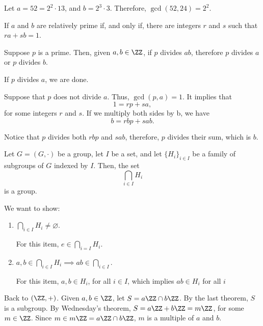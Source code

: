 \begin{exmp}
	Let $a = 52 = 2^2 \cdot 13$, and $b = 2^3 \cdot 3$. Therefore,  $\gcd(52, 24) = 2^2$.
\end{exmp}

\begin{cor}
	If $a$ and $b$ are relatively prime if, and only if, there are integers $r$ and $s$ such that $ra + sb = 1$.
\end{cor}

\begin{cor}
	Suppose $p$ is a prime. Then, given $a, b \in \ZZ$, if $p$ divides $ab$, therefore $p$ divides $a$ or $p$ divides $b$.  
\end{cor}

\begin{dem}
	If $p$ divides $a$, we are done.

	Suppose that $p$ does not divide $a$. Thus, $\gcd(p, a) = 1$. It implies that \[1 = rp + sa,\] for some integers $r$ and $s$. If we multiply both sides by b, we have \[b = rbp + sab.\]

	Notice that $p$ divides both $rbp$ and $sab$, therefore, $p$ divides their sum, which is $b$.
\end{dem}

\begin{thm}
	Let $G = (G, \cdot)$ be a group, let $I$ be a set, and let $\{H_i\}_{i \in I}$ be a family of subgroups of $G$ indexed by $I$. Then, the set \[\bigcap_{i \in I} H_i\] is a group.
\end{thm}

\begin{dem}
	We want to show:
	\begin{enumerate}[label = (\roman*)]
		\item $\bigcap_{i \in I}H_i \neq \varnothing$.

			For this item, $e \in \bigcap_{i = I}H_i$.

		\item $a, b \in \bigcap_{i \in I} H_i \implies ab \in \bigcap_{i \in I}$.

			For this item, $a, b \in H_i$, for all $i \in I$, which implies $ab \in H_i$ for all $i$
	\end{enumerate}
\end{dem}

Back to $(\ZZ, +)$. Given  $a, b \in \ZZ$, let $S = a\ZZ \cap b\ZZ$. By the last theorem,  $S$ is a subgroup. By Wednesday's theorem, $S = a\ZZ + b\ZZ = m\ZZ$, for some  $m \in \ZZ$. Since $m \in m\ZZ = a\ZZ \cap b\ZZ$, $m$ is a multiple of $a$ and $b$.

